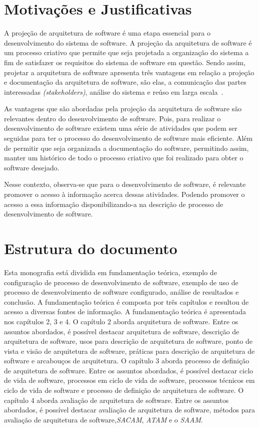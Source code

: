 \section{Motivações e Justificativas}

A projeção de arquitetura de software é uma etapa essencial para o desenvolvimento do sistema de software. A projeção da arquitetura de software é um processo criativo que permite que seja projetada a organização do sistema a fim de satisfazer os requisitos do sistema de software em questão. Sendo assim, projetar a arquitetura de software apresenta três vantagens em relação a projeção e documentação da arquitetura de software, são elas, a comunicação das partes interessadas \emph{(stakeholders)}, análise do sistema e reúso em larga escala~\cite{Sommerville_2011_texbook}.

As vantagens que são abordadas pela projeção da arquitetura de software são relevantes dentro do desenvolvimento de software. Pois, para realizar o desenvolvimento de software existem uma série de atividades que podem ser seguidas para ter o processo do desenvolvimento de software mais eficiente. Além de permitir que seja organizada a documentação do software, permitindo assim, manter um histórico de todo o processo criativo que foi realizado para obter o software desejado.

Nesse contexto, observa-se que para o desenvolvimento de software, é relevante promover o acesso à informação acerca dessas atividades. Podendo promover o acesso a essa informação disponibilizando-a na descrição de processo de desenvolvimento de software.

\section{Estrutura do documento}

Esta monografia está dividida em fundamentação teórica, exemplo de configuração de processo de desenvolvimento de software, exemplo de uso de processo de desenvolvimento de software configurado, análise de resultados e conclusão. A fundamentação teórica é composta por três capítulos e resultou de acesso a diversas fontes de informação. A fundamentação teórica é apresentada nos capítulos 2, 3 e 4. O capítulo 2 aborda arquitetura de software. Entre os assuntos abordados, é possível destacar arquitetura de software, descrição de arquitetura de software, usos para descrição de arquitetura de software, ponto de vista e visão de arquitetura de software, práticas para descrição de arquitetura de software e arcabouços de arquitetura. O capítulo 3 aborda processo de definição de arquitetura de software. Entre os assuntos abordados, é possível destacar ciclo de vida de software, processos em ciclo de vida de software, processos técnicos em ciclo de vida de software e processo de definição de arquitetura de software. O capítulo  4 aborda avaliação de arquitetura de software. Entre os assuntos abordados, é possível destacar avaliação de arquitetura de software, métodos para avaliação de arquitetura de software,\emph{\acrfull{SACAM}}, \emph{\acrfull{ATAM}} e o \emph{\acrfull{SAAM}}. 

